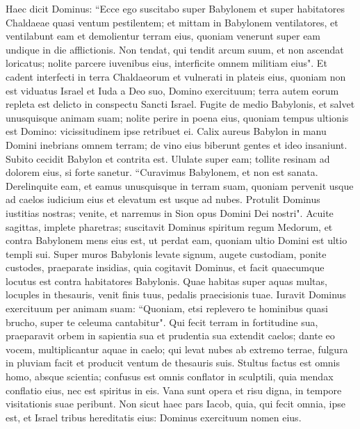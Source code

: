 \begin{biblechapter}  
\verse Haec dicit Dominus: “Ecce ego suscitabo super Babylonem et super habitatores Chaldaeae quasi ventum pestilentem; 
\verse et mittam in Babylonem ventilatores, et ventilabunt eam et demolientur terram eius, quoniam venerunt super eam undique in die afflictionis. 
\verse Non tendat, qui tendit arcum suum, et non ascendat loricatus; nolite parcere iuvenibus eius, interficite omnem militiam eius". 
\verse Et cadent interfecti in terra Chaldaeorum et vulnerati in plateis eius, 
\verse quoniam non est viduatus Israel et Iuda a Deo suo, Domino exercituum; terra autem eorum repleta est delicto in conspectu Sancti Israel. 
\verse Fugite de medio Babylonis, et salvet unusquisque animam suam; nolite perire in poena eius, quoniam tempus ultionis est Domino: vicissitudinem ipse retribuet ei. 
\verse Calix aureus Babylon in manu Domini inebrians omnem terram; de vino eius biberunt gentes et ideo insaniunt. 
\verse Subito cecidit Babylon et contrita est. Ululate super eam; tollite resinam ad dolorem eius, si forte sanetur. 
\verse “Curavimus Babylonem, et non est sanata. Derelinquite eam, et eamus unusquisque in terram suam, quoniam pervenit usque ad caelos iudicium eius et elevatum est usque ad nubes. 
\verse Protulit Dominus iustitias nostras; venite, et narremus in Sion opus Domini Dei nostri". 
\verse Acuite sagittas, implete pharetras; suscitavit Dominus spiritum regum Medorum, et contra Babylonem mens eius est, ut perdat eam, quoniam ultio Domini est ultio templi sui. 
\verse Super muros Babylonis levate signum, augete custodiam, ponite custodes, praeparate insidias, quia cogitavit Dominus, et facit quaecumque locutus est contra habitatores Babylonis. 
\verse Quae habitas super aquas multas, locuples in thesauris, venit finis tuus, pedalis praecisionis tuae. 
\verse Iuravit Dominus exercituum per animam suam: “Quoniam, etsi replevero te hominibus quasi brucho, super te celeuma cantabitur". 
\verse Qui fecit terram in fortitudine sua, praeparavit orbem in sapientia sua et prudentia sua extendit caelos; 
\verse dante eo vocem, multiplicantur aquae in caelo; qui levat nubes ab extremo terrae, fulgura in pluviam facit et producit ventum de thesauris suis. 
\verse Stultus factus est omnis homo, absque scientia; confusus est omnis conflator in sculptili, quia mendax conflatio eius, nec est spiritus in eis. 
\verse Vana sunt opera et risu digna, in tempore visitationis suae peribunt. 
\verse Non sicut haec pars Iacob, quia, qui fecit omnia, ipse est, et Israel tribus hereditatis eius: Dominus exercituum nomen eius. 

\end{biblechapter}

